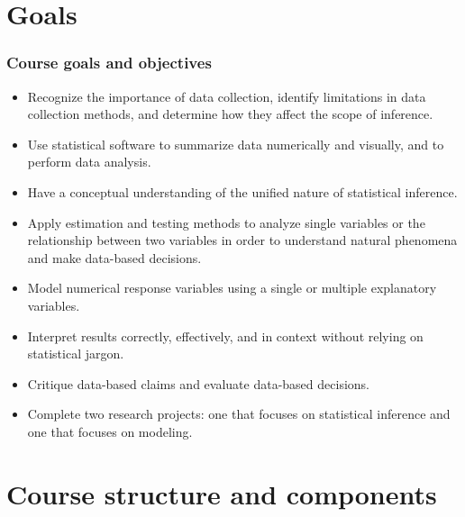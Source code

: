 \documentclass[slidestop,compress,mathserif,12pt,t,professionalfonts,xcolor=table]{beamer}
\begin{document}

\section{Goals}


\begin{frame}
\frametitle{Course goals and objectives}

{\footnotesize
\begin{itemize}[<alert@+>]
\item Recognize the importance of data collection, identify limitations in data collection methods, and determine how they affect the scope of inference.
\item Use statistical software to summarize data numerically and visually, and to perform data analysis.
\item Have a conceptual understanding of the unified nature of statistical inference.
\item Apply estimation and testing methods to analyze single variables or the relationship between two variables in order to understand natural phenomena and make data-based decisions.
\item Model numerical response variables using a single or multiple explanatory variables.
\item Interpret results correctly, effectively, and in context without relying on statistical jargon.
\item Critique data-based claims and evaluate data-based decisions.
\item Complete two research projects: one that focuses on statistical inference and one that focuses on modeling. 
\end{itemize}
}

\end{frame}


\section{Course structure and components}

\end{document}

